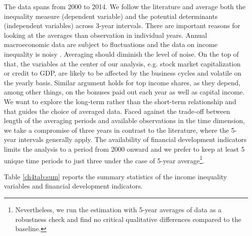 \begin{refsection}
The data spans from 2000 to 2014. We follow the literature \parencite{dabla2015causes,de2017finance} and average both the inequality measure (dependent variable) and the potential determinants (independent variables) across 3-year intervals. There are important reasons for looking at the averages than observation in individual years. Annual macroeconomic data are subject to fluctuations and the data on income inequality is noisy \parencite{delis2014}. Averaging should diminish the level of noise. On the top of that, the variables at the center of our analysis, e.g. stock market capitalization or credit to \ac{GDP}, are likely to be affected by the business cycles and volatile on the yearly basis. Similar argument holds for top income shares, as they depend, among other things, on the bonuses paid out each year as well as capital income. We want to explore the long-term rather than the short-term relationship and that guides the choice of averaged data. Faced against the trade-off between length of the averaging periods and available observations in the time dimension, we take a compromise of three years in contrast to the literature, where the 5-year intervals generally apply. The availability of financial development indicators limits the analysis to a period from 2000 onward and we prefer to keep at least 5 unique time periods to just three under the case of 5-year average\footnote{Nevertheless, we run the estimation with 5-year averages of data as a robustness check and find no critical qualitative differences compared to the baseline.}.

Table \ref{ch4tab:sum} reports the summary statistics of the income inequality variables and financial development indicators.



\end{refsection}
